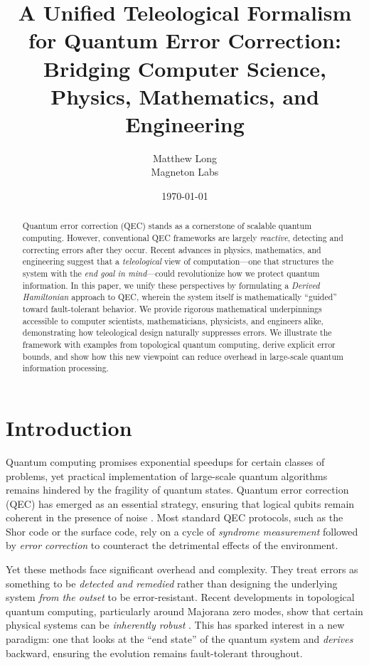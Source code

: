 \documentclass[11pt]{article}
\title{\textbf{A Unified Teleological Formalism for Quantum Error Correction:\\
Bridging Computer Science, Physics, Mathematics, and Engineering}}
\author{Matthew Long \\
Magneton Labs}
\date{\today}
\begin{document}
\maketitle

\begin{abstract}
Quantum error correction (QEC) stands as a cornerstone of scalable quantum computing. However, conventional QEC frameworks are largely \emph{reactive}, detecting and correcting errors after they occur. Recent advances in physics, mathematics, and engineering suggest that a \emph{teleological} view of computation---one that structures the system with the \emph{end goal in mind}---could revolutionize how we protect quantum information. In this paper, we unify these perspectives by formulating a \emph{Derived Hamiltonian} approach to QEC, wherein the system itself is mathematically ``guided'' toward fault-tolerant behavior. We provide rigorous mathematical underpinnings accessible to computer scientists, mathematicians, physicists, and engineers alike, demonstrating how teleological design naturally suppresses errors. We illustrate the framework with examples from topological quantum computing, derive explicit error bounds, and show how this new viewpoint can reduce overhead in large-scale quantum information processing.
\end{abstract}

\tableofcontents

\section{Introduction}
Quantum computing promises exponential speedups for certain classes of problems, yet practical implementation of large-scale quantum algorithms remains hindered by the fragility of quantum states. Quantum error correction (QEC) has emerged as an essential strategy, ensuring that logical qubits remain coherent in the presence of noise \cite{NielsenChuang, Preskill}. Most standard QEC protocols, such as the Shor code or the surface code, rely on a cycle of \emph{syndrome measurement} followed by \emph{error correction} to counteract the detrimental effects of the environment.

Yet these methods face significant overhead and complexity. They treat errors as something to be \emph{detected and remedied} rather than designing the underlying system \emph{from the outset} to be error-resistant. Recent developments in topological quantum computing, particularly around Majorana zero modes, show that certain physical systems can be \emph{inherently robust} \cite{Kitaev, Freedman}. This has sparked interest in a new paradigm: one that looks at the ``end state'' of the quantum system and \emph{derives} backward, ensuring the evolution remains fault-tolerant throughout.
\end{document}
